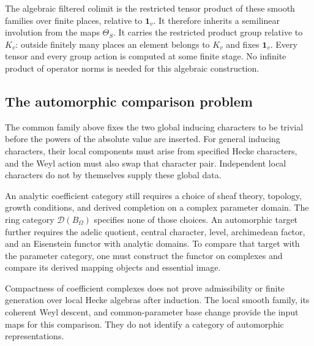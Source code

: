 The algebraic filtered colimit is the restricted tensor product of these
smooth families over finite places, relative to $\mathbf1_v$.
It therefore inherits a semilinear involution from the maps $\Theta_S$.
It carries the restricted product group relative to $K_v$:
outside finitely many places an element belongs to $K_v$ and fixes $\mathbf1_v$.
Every tensor and every group action is computed at some finite stage.
No infinite product of operator norms is needed for this algebraic construction.

\subsection{The automorphic comparison problem}

The common family above fixes the two global inducing characters to be trivial
before the powers of the absolute value are inserted.
For general inducing characters, their local components must arise from
specified Hecke characters, and the Weyl action must also swap that character pair.
Independent local characters do not by themselves supply these global data.

An analytic coefficient category still requires a choice of sheaf theory,
topology, growth conditions, and derived completion on a complex parameter domain.
The ring category $\mathcal D(B_\Omega)$ specifies none of those choices.
An automorphic target further requires the adelic quotient, central character,
level, archimedean factor, and an Eisenstein functor with analytic domains.
To compare that target with the parameter category, one must construct
the functor on complexes and compare its derived mapping objects and essential image.

Compactness of coefficient complexes does not prove admissibility or
finite generation over local Hecke algebras after induction.
The local smooth family, its coherent Weyl descent, and common-parameter
base change provide the input maps for this comparison.
They do not identify a category of automorphic representations.



